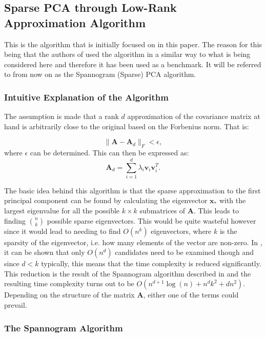 \documentclass[11pt,a4paper]{article}
\begin{document}
\subsection{Sparse PCA through Low-Rank Approximation Algorithm}
This is the algorithm\cite{dimakis} that is initially focused on in this paper. The reason for this being that the authors of\cite{dimakis} used the algorithm in a similar way to what is being considered here and therefore it has been used as a benchmark. It will be referred to from now on as the Spannogram (Sparse) PCA  algorithm.

\subsubsection{Intuitive Explanation of the Algorithm}
The assumption is made that a rank $d$ approximation of the covariance matrix at hand is arbitrarily close to the original based on the Forbenius norm. That is:

\begin{equation*}
\|\mathbf{A} - \mathbf{A}_d\|_F < \epsilon,
\end{equation*}
where $\epsilon$ can be determined. This can then be expressed as:
\begin{equation*}
\mathbf{A}_d = \sum_{i=1}^d \lambda_i \mathbf{v}_i \mathbf{v}_i^T.
\end{equation*}

The basic idea behind this algorithm is that the sparse approximation to the first principal component can be found by calculating the eigenvector $\mathbf{x}_*$ with the largest eigenvalue for all the possible $k\times k$ submatrices of $\mathbf{A}$. This leads to finding $n \choose k$ possible sparse eigenvectors. This would be quite wasteful however since it would lead to needing to find $O\left( n^k\right)$ eigenvectors, where $k$ is the sparsity of the eigenvector, i.e. how many elements of the vector are non-zero. In \cite{dimakis}, it can be shown that only $O\left(n^d\right)$ candidates need to be examined though and since $d < k$ typically, this means that the time complexity is reduced significantly. This reduction is the result of the Spannogram algorithm described in \cite{dimakis} and the resulting time complexity turns out to be $O \left( n^{d+1}\log(n) + n^d k^2 + dn^2\right)$. Depending on the structure of the matrix $\mathbf{A}$, either one of the terms could prevail.

\subsubsection{The Spannogram Algorithm}
\end{document}
